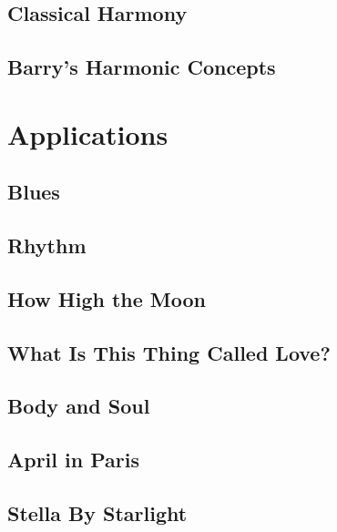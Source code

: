 \documentclass[twoside]{book}
\begin{document}
\chapter{Classical Harmony}


\chapter{Barry's Harmonic Concepts}


\part{Applications}

\chapter{Blues}


\chapter{Rhythm}


\chapter{How High the Moon}


\chapter{What Is This Thing Called Love?}


\chapter{Body and Soul}


\chapter{April in Paris}


\chapter{Stella By Starlight}

\end{document}

